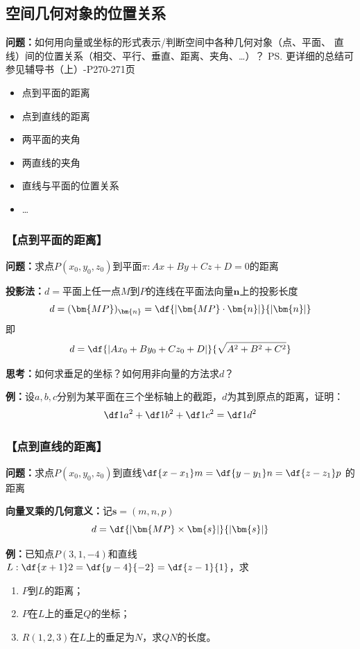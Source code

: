 \subsection{空间几何对象的位置关系}

{\bf 问题：}如何用向量或坐标的形式表示/判断空间中各种几何对象（点、平面、
直线）间的位置关系（相交、平行、垂直、距离、夹角、\ldots）？ 
\ps{更详细的总结可参见辅导书（上）-P270-271页}
\begin{itemize}
  \item 点到平面的距离 
  \item 点到直线的距离 
  \item 两平面的夹角 
  \item 两直线的夹角 
  \item 直线与平面的位置关系
  \item \ldots
\end{itemize}

\subsubsection{【点到平面的距离】}

{\bf 问题：}求点$P(x_0,y_0,z_0)$到平面$\pi:Ax+By+Cz+D=0$的距离

{\bf 投影法：}$d=$平面上任一点$M$到$P$的连线在平面法向量$\bm{n}$上的投影长度 
$$d=(\bm{MP})_{\bm{n}}=\df{|\bm{MP}\cdot\bm{n}|}{|\bm{n}|}$$ 
即
$${d=\df{|Ax_0+By_0+Cz_0+D|}{\sqrt{A^2+B^2+C^2}}}$$

{\bf 思考：}如何求垂足的坐标？如何用非向量的方法求$d$？

{\bf 例：}设$a,b,c$分别为某平面在三个坐标轴上的截距，$d$为其到原点的距离，证明：
$$\df1{a^2}+\df1{b^2}+\df1{c^2}=\df1{d^2}$$

\subsubsection{【点到直线的距离】}

{\bf 问题：}求点$P(x_0,y_0,z_0)$到直线$\df{x-x_1}m=\df{y-y_1}n=\df{z-z_1}p$
的距离

{\bf 向量叉乘的几何意义：}记$\bm{s}=(m,n,p)$
$$d=\df{|\bm{MP}\times\bm{s}|}{|\bm{s}|}$$

{\bf 例：}已知点$P(3,1,-4)$和直线$L:\df{x+1}2=\df{y-4}{-2}=\df{z-1}{1}$，求
\begin{enumerate}[(1)]
  \setlength{\itemindent}{1cm}
  \item $P$到$L$的距离；
  \item $P$在$L$上的垂足$Q$的坐标；
  \item $R(1,2,3)$在$L$上的垂足为$N$，求$QN$的长度。
\end{enumerate}


